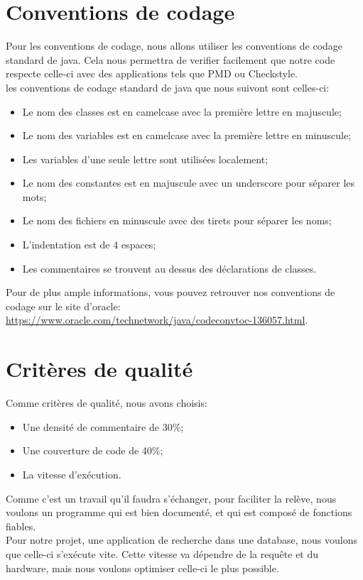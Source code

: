 \documentclass[a4paper,11pt]{article}
\begin{document}
\section{Conventions de codage}
Pour les conventions de codage, nous allons utiliser les conventions de codage standard de java.
Cela nous permettra de verifier facilement que notre code respecte celle-ci avec des applications tels que PMD ou Checkstyle.\\
les conventions de codage standard de java que nous suivont sont celles-ci:
\begin{itemize}
  \item Le nom des classes est en camelcase avec la première lettre en majuscule;
  \item Le nom des variables est en camelcase avec la première lettre en minuscule;
  \item Les variables d'une seule lettre sont utilisées localement;
  \item Le nom des constantes est en majuscule avec un underscore pour séparer les mots;
  \item Le nom des fichiers en minuscule avec des tirets pour séparer les noms;
  \item L'indentation est de 4 espaces;
  \item Les commentaires se trouvent au dessus des déclarations de classes.
\end{itemize}


Pour de plus ample informations, vous pouvez retrouver nos conventions de codage sur le site d'oracle:
\url{https://www.oracle.com/technetwork/java/codeconvtoc-136057.html}.

\section{Critères de qualité}
Comme critères de qualité, nous avons choisis:
\begin{itemize}
  \item Une densité de commentaire de 30\%;
  \item Une couverture de code de 40\%;
  \item La vitesse d'exécution.
\end{itemize}


Comme c'est un travail qu'il faudra s'échanger, pour faciliter la relève,
nous voulons un programme qui est bien documenté, et qui est composé de fonctions fiables.\\
Pour notre projet, une application de recherche dans une database, nous voulons que celle-ci s'exécute vite.
Cette vitesse va dépendre de la requête et du hardware, mais nous voulons optimiser celle-ci le plus possible.
\end{document}
